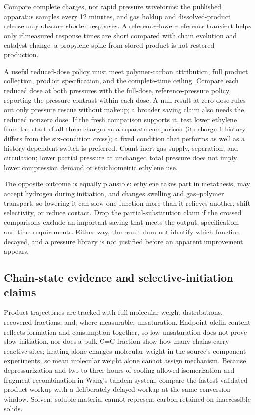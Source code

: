 Compare complete charges, not rapid pressure waveforms: the published apparatus samples every 12 minutes, and gas holdup and dissolved-product release may obscure shorter responses.\cite{conk2024si} A reference--lower--reference transient helps only if measured response times are short compared with chain evolution and catalyst change; a propylene spike from stored product is not restored production.

A useful reduced-dose policy must meet polymer-carbon attribution, full product collection, product specification, and the complete-time ceiling. Compare each reduced dose at both pressures with the full-dose, reference-pressure policy, reporting the pressure contrast within each dose. A null result at zero dose rules out only pressure rescue without makeup; a broader saving claim also needs the reduced nonzero dose. If the fresh comparison supports it, test lower ethylene from the start of all three charges as a separate comparison (its charge-1 history differs from the six-condition cross); a fixed condition that performs as well as a history-dependent switch is preferred. Count inert-gas supply, separation, and circulation; lower partial pressure at unchanged total pressure does not imply lower compression demand or stoichiometric ethylene use.

The opposite outcome is equally plausible: ethylene takes part in metathesis, may accept hydrogen during initiation, and changes swelling and gas--polymer transport, so lowering it can slow one function more than it relieves another, shift selectivity, or reduce contact. Drop the partial-substitution claim if the crossed comparisons exclude an important saving that meets the output, specification, and time requirements. Either way, the result does not identify which function decayed, and a pressure library is not justified before an apparent improvement appears.

\subsection{Chain-state evidence and selective-initiation claims}

Product trajectories are tracked with full molecular-weight distributions, recovered fractions, and, where measurable, unsaturation. Endpoint olefin content reflects formation and consumption together, so low unsaturation does not prove slow initiation, nor does a bulk C=C fraction show how many chains carry reactive sites; heating alone changes molecular weight in the source's component experiments, so mean molecular weight alone cannot assign mechanism.\cite{conk2024} Because depressurization and two to three hours of cooling allowed isomerization and fragment recombination in Wang's tandem system,\cite[ch.~4, pp.~72--74]{wang2022thesis} compare the fastest validated product workup with a deliberately delayed workup at the same conversion window. Solvent-soluble material cannot represent carbon retained on inaccessible solids.

